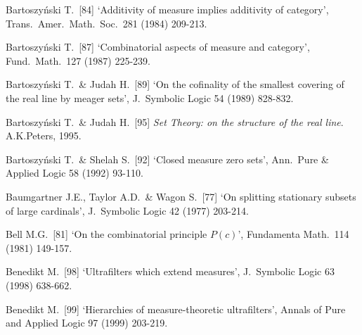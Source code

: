 {Bartoszy\'nski T.\ [84] `Additivity of measure implies additivity of
category', Trans.\ Amer.\ Math.\ Soc.\ 281 (1984) 209-213.

Bartoszy\'nski T.\ [87] `Combinatorial aspects of measure and category',
Fund.\ Math.\ 127 (1987) 225-239.
\cmmnt{[522S.]}




Bartoszy\'nski T.\ \& Judah H.\ [89] `On the cofinality of the smallest
covering of the real line by meager sets', J.\ Symbolic Logic 54 (1989) 828-832.
\cmmnt{[522V.]}

Bartoszy\'nski T.\ \& Judah H.\ [95] {\it Set Theory:  on the structure
of the real line}.  A.K.Peters, 1995.



Bartoszy\'nski T.\ \& Shelah S.\ [92] `Closed measure zero sets', Ann.\
Pure \& Applied Logic 58 (1992) 93-110.
\cmmnt{[526M.]}

Baumgartner J.E., Taylor A.D.\ \& Wagon S.\ [77] `On splitting
stationary subsets of large cardinals',
J.\ Symbolic Logic 42 (1977) 203-214.

Bell M.G.\ [81] `On the combinatorial principle $P(c)$',
Fundamenta Math.\ 114 (1981) 149-157.
\cmmnt{[\S517 {\it notes\/}.]}

Benedikt M.\ [98] `Ultrafilters which extend measures',
J.\ Symbolic Logic 63 (1998) 638-662.
\cmmnt{[538M, 538Xm, \S538 {\it notes\/}.]}

Benedikt M.\ [99] `Hierarchies of measure-theoretic ultrafilters',
Annals of Pure and Applied Logic 97 (1999) 203-219.
\cmmnt{[538H.]}

}
